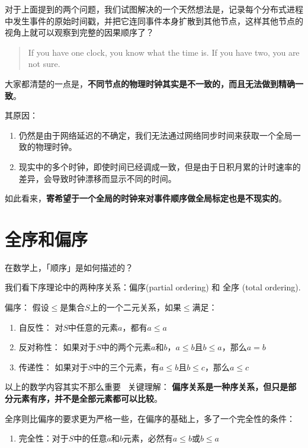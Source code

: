 \documentclass[cn,11pt,chinese]{elegantbook}
\begin{document}
对于上面提到的两个问题，我们试图解决的一个天然想法是，记录每个分布式进程中发生事件的原始时间戳，并把它连同事件本身扩散到其他节点，这样其他节点的视角上就可以观察到完整的因果顺序了？

\begin{quotation}
    If you have one clock, you know what the time is. If you have two, you are not sure.
\end{quotation}

大家都清楚的一点是，\textbf{不同节点的物理时钟其实是不一致的，而且无法做到精确一致}。

其原因：

\begin{enumerate}
    \item 仍然是由于网络延迟的不确定，我们无法通过网络同步时间来获取一个全局一致的物理时钟。
    \item 现实中的多个时钟，即使时间已经调成一致，但是由于日积月累的计时速率的差异，会导致时钟漂移而显示不同的时间。
\end{enumerate}

如此看来，\textbf{寄希望于一个全局的时钟来对事件顺序做全局标定也是不现实的}。

\section{全序和偏序}

在数学上，「顺序」是如何描述的？

我们看下序理论中的两种序关系：偏序(partial ordering) 和 全序 (total ordering).

偏序： 假设$\leq$是集合$S$上的一个二元关系，如果$\leq$满足：

\begin{enumerate}
    \item 自反性： 对$S$中任意的元素$a$，都有$a \leq a$
    \item 反对称性： 如果对于$S$中的两个元素$a$和$b$，$a \leq b$且$b \leq a$，那么$a = b$
    \item 传递性： 如果对于$S$中的三个元素，有$a \leq b$且$b \leq c$，那么$a \leq c$
\end{enumerate}

以上的数学内容其实不那么重要~ 关键理解： \textbf{偏序关系是一种序关系，但只是部分元素有序，并不是全部元素都可以比较}。

全序则比偏序的要求更为严格一些，在偏序的基础上，多了一个完全性的条件：

\begin{enumerate}
    \item 完全性：对于$S$中的任意$a$和$b$元素，必然有$a \leq b$或$b \leq a$
\end{enumerate}
\end{document}
